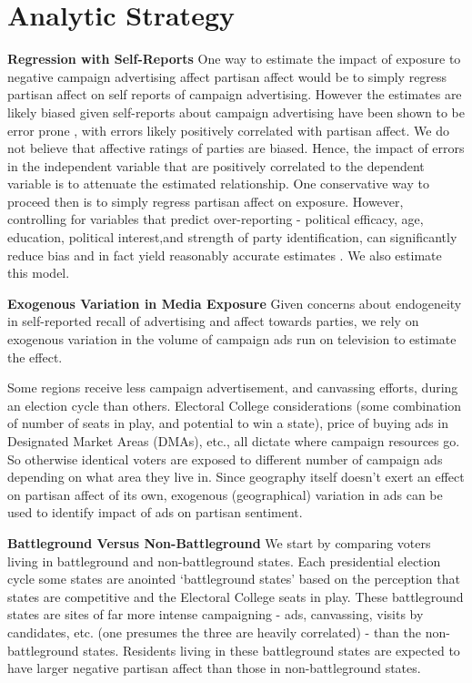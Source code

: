 \documentclass[doc,fignum,noapacite]{apa}
\begin{document}
\section{Analytic Strategy}

\textbf{Regression with Self-Reports}
One way to estimate the impact of exposure to negative campaign advertising affect partisan affect would be to 
simply regress partisan affect on self reports of campaign advertising. However the estimates are likely biased 
given self-reports about campaign advertising have been shown to be error prone \cite {Ansolabehere1999, 
Johnston2004, Goldstein2004, Vavreck2007}, with errors likely positively correlated with partisan affect. 
We do not believe that affective ratings of parties are biased. Hence, the impact of errors in the independent variable
that are positively correlated to the dependent variable is to attenuate the estimated relationship. One conservative 
way to proceed then is to simply regress partisan affect on exposure. However, controlling for variables that predict 
over-reporting - political efficacy, age, education, political interest,and strength of party identification, can 
significantly reduce bias and in fact yield reasonably accurate estimates \cite {Vavreck2007}. We also estimate 
this model.

\textbf{Exogenous Variation in Media Exposure}
Given concerns about endogeneity in self-reported recall of advertising and affect towards parties, we rely on 
exogenous variation in the volume of campaign ads run on television to estimate the effect.

Some regions receive less campaign advertisement, and canvassing efforts, during an election cycle than others.  
Electoral College considerations (some combination of number of seats in play, and potential to win a state), 
price of buying ads in Designated Market Areas (DMAs), etc., all dictate where campaign resources go. So otherwise 
identical voters are exposed to different number of campaign ads depending on what area they live in. Since geography 
itself doesn't exert an effect on partisan affect of its own, exogenous (geographical) variation in ads can be used to 
identify impact of ads on partisan sentiment.

\textbf{Battleground Versus Non-Battleground}
We start by comparing voters living in battleground and non-battleground states. Each presidential election cycle 
some states are anointed `battleground states' based on the perception that states are competitive and the 
Electoral College seats in play. These battleground states are sites of far more intense campaigning - ads, 
canvassing, visits by candidates, etc. (one presumes the three are heavily correlated) - than the non-battleground 
states. Residents living in these battleground states are expected to have larger negative partisan affect than those 
in non-battleground states. 
\end{document}

